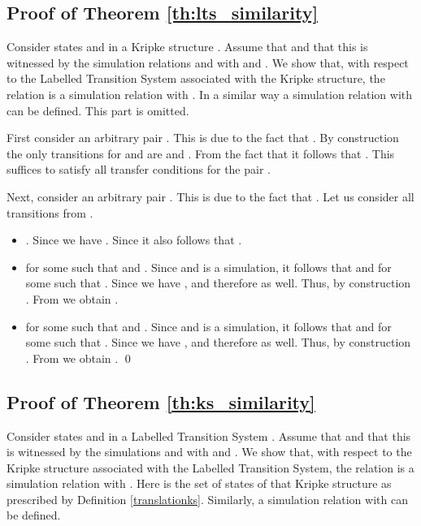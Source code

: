 \documentclass{llncs}
\begin{document}
\subsection{Proof of Theorem \ref{th:lts_similarity}}
\label{pf:th:lts_similarity}

Consider states  and  in a Kripke structure . Assume that  and that this is witnessed by the simulation relations  and  with  and .
We show that, with respect to the Labelled Transition System associated with the Kripke structure, the relation  is a simulation relation with  . In a similar way a simulation relation  with  can be defined. This part is omitted.

First consider an arbitrary pair . This is due to the fact that . By construction the only transitions for  and  are  and . From the fact that  it follows that . This suffices to satisfy all transfer conditions for the pair .

Next, consider an arbitrary pair . This is due to the fact that . Let us consider all transitions from .
\begin{itemize}
\item . Since  we have . Since  it also follows that .

\item  for some  such that  and .
Since  and  is a simulation, it follows that  and  for some  such that . Since  we have , and therefore  as well. Thus, by construction . From  we obtain .

\item  for some  such that  and .
Since  and  is a simulation, it follows that  and  for some  such that . Since  we have , and therefore  as well. Thus, by construction . From  we obtain . \qed
\end{itemize}

\subsection{Proof of Theorem \ref{th:ks_similarity}}
\label{pf:th:ks_similarity}

Consider states  and  in a Labelled Transition System . Assume that  and that this
is witnessed by the simulations  and  with 
and . We show that, with respect to the Kripke structure
associated with the Labelled Transition System, the relation  is a simulation relation with . Here  is
the set of states of that Kripke structure as prescribed by Definition
\ref{translationks}. Similarly, a simulation relation  with  can be defined.
\end{document}
